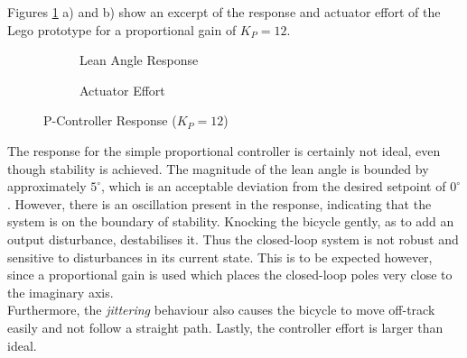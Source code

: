 Figures \ref{fig:LegoPController} a) and b) show an excerpt of the response and actuator effort of the Lego prototype for a proportional gain of $K_P=12$.

\begin{figure}[H]
	\begin{subfigure}{0.5\textwidth}
	\caption{Lean Angle Response}
	\end{subfigure} \hspace{1mm}
	\begin{subfigure}{0.5\textwidth}
	\caption{Actuator Effort}
	\end{subfigure}
	\caption{P-Controller Response ($K_P=12$)}
	\label{fig:LegoPController}
\end{figure}

The response for the simple proportional controller is certainly not ideal, even though stability is achieved.  The magnitude of the lean angle is bounded by approximately $5^{\circ}$, which is an acceptable deviation from the desired setpoint of $0^{\circ}$. However, there is an oscillation present in the response, indicating that the system is on the boundary of stability. Knocking the bicycle gently, as to add an output disturbance, destabilises it. Thus the closed-loop system is not robust and sensitive to disturbances in its current state. This is to be expected however, since a proportional gain is used which places the closed-loop poles very close to the imaginary axis. \\
Furthermore, the \textit{jittering} behaviour also causes the bicycle to move off-track easily and not follow a straight path. Lastly, the controller effort is larger than ideal. \\

